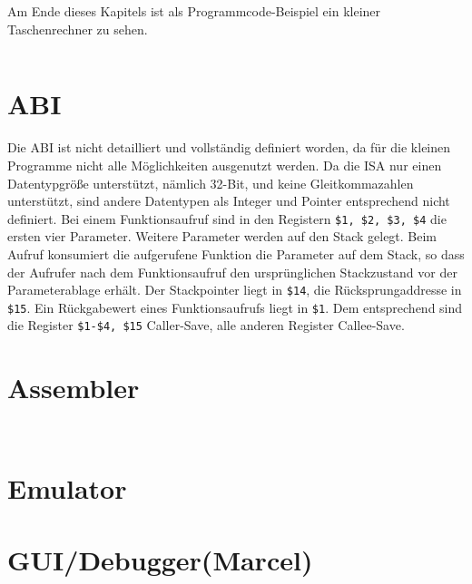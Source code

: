 
Am Ende dieses Kapitels ist als Programmcode-Beispiel ein kleiner Taschenrechner zu sehen.

\newpage
\begin{center}
\begin{multicols}{3}
\inputminted{nasm}{calc.s}
\end{multicols}
\end{center}

\newpage
\section{ABI}
Die ABI ist nicht detailliert und vollständig definiert worden, da für die kleinen Programme nicht alle Möglichkeiten ausgenutzt werden.
Da die ISA nur einen Datentypgröße unterstützt, nämlich 32-Bit, und keine Gleitkommazahlen unterstützt, sind andere Datentypen als Integer und Pointer entsprechend nicht definiert.
Bei einem Funktionsaufruf sind in den Registern \texttt{\$1, \$2, \$3, \$4} die ersten vier Parameter.
Weitere Parameter werden auf den Stack gelegt.
Beim Aufruf konsumiert die aufgerufene Funktion die Parameter auf dem Stack,
so dass der Aufrufer nach dem Funktionsaufruf den ursprünglichen Stackzustand vor der Parameterablage erhält. 
Der Stackpointer liegt in \texttt{\$14}, die Rücksprungaddresse in \texttt{\$15}.
Ein Rückgabewert eines Funktionsaufrufs liegt in \texttt{\$1}.
Dem entsprechend sind die Register \texttt{\$1-\$4, \$15} Caller-Save, alle anderen Register Callee-Save.

\section{Assembler} %

\begin{center}
\inputminted{py}{../assembler/operations/memOperation.py}
\end{center}

\begin{center}
\inputminted[firstline=59,lastline=75]{py}{../assembler/operations/pseudoOperation.py}
\end{center}

\section{Emulator} %

\section{GUI/Debugger(Marcel)}

